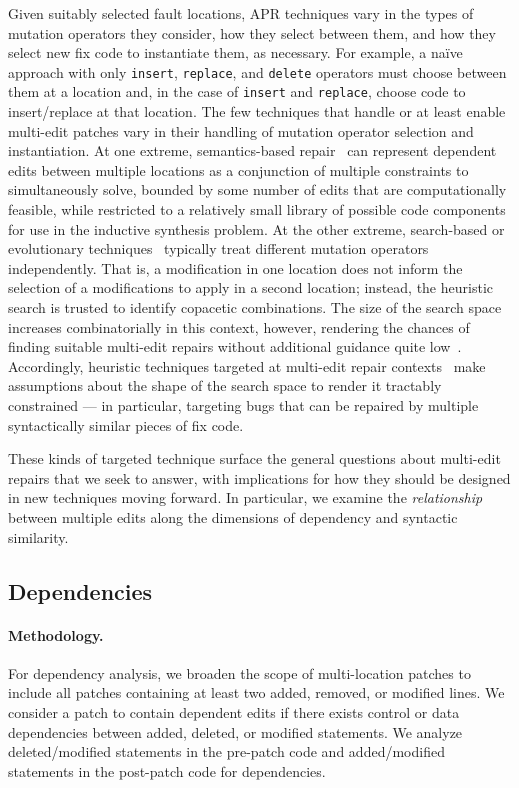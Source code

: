 \documentclass[sigconf, timestamp-false, anonymous=true]{acmart}
\begin{document}
Given suitably selected fault locations, APR techniques vary in the types of
mutation operators they consider, how they select between them, and how they
select new fix code to instantiate them, as necessary.  For example, a na{\"i}ve
approach with only \texttt{insert}, \texttt{replace}, and \texttt{delete}
operators must choose between them at a location and, in the case of
\texttt{insert} and \texttt{replace}, choose code to insert/replace at that
location.  
%
The few techniques that handle or at least enable multi-edit patches vary in their
handling of mutation operator selection and instantiation.  At one
extreme, semantics-based repair~\cite{s3,angelix} can represent dependent edits between multiple
locations as a conjunction of multiple constraints to simultaneously solve,
bounded by some number of edits that are computationally feasible, while
restricted to a relatively small library of possible code components for use in
the inductive synthesis problem.    At the other extreme, search-based or
evolutionary techniques~\cite{genprog,others} typically treat different mutation
operators independently.  That is, a modification in one location does not
inform the selection of a modifications to apply in a second location; instead,
the heuristic search is trusted to identify copacetic combinations.  The size of
the search space increases combinatorially in this context, however, rendering
the chances of finding suitable multi-edit repairs without additional guidance
quite low~\cite{ae,long2016}. Accordingly, heuristic techniques targeted at multi-edit
repair contexts~\cite{hercules,maybewang2018} make assumptions about the
shape of the search space to render it tractably constrained --- in particular,
targeting bugs that can be repaired by multiple syntactically similar pieces of
fix code.

These kinds of targeted technique surface the general questions about
multi-edit repairs that we seek to answer, with
implications for how they should be designed in new techniques moving forward.
In particular, we examine the \emph{relationship} between multiple edits 
along the dimensions of dependency and syntactic similarity.

\subsection{Dependencies}


\paragraph{Methodology.} 
For dependency analysis, we broaden the scope of multi-location patches to 
include all patches containing at least two added, removed, or modified lines.
We consider a patch to contain dependent edits if there exists 
control or data dependencies between added, deleted, or modified statements.
We analyze deleted/modified statements in the pre-patch code 
and added/modified statements in the post-patch code for dependencies.
  
\end{document}
